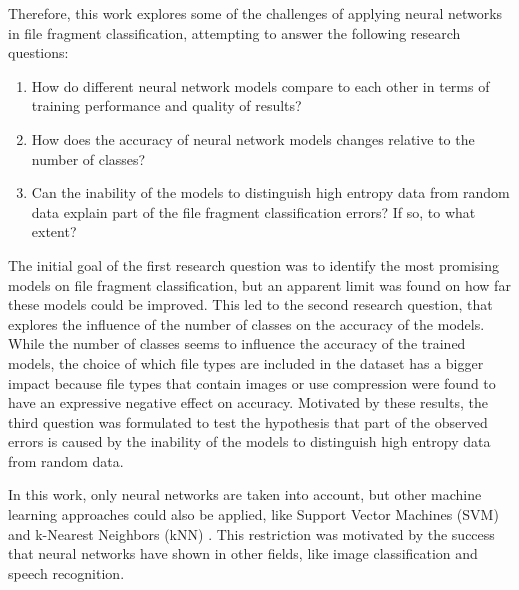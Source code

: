 Therefore, this work explores some of the challenges of applying neural networks in file fragment classification, attempting to answer the following research questions:

\begin{enumerate}[itemindent=\parindent,label=\textbf{Q\arabic*.}]

    \item How do different neural network models compare to each other in terms of training performance and quality of results?
    
    \item How does the accuracy of neural network models changes relative to the number of classes?

    \item Can the inability of the models to distinguish high entropy data from random data explain part of the file fragment classification errors? If so, to what extent?
\end{enumerate}

The initial goal of the first research question was to identify the most promising models on file fragment classification, but an apparent limit was found on how far these models could be improved.
This led to the second research question, that explores the influence of the number of classes on the accuracy of the models. While the number of classes seems to influence the accuracy of the trained models, the choice of which file types are included in the dataset has a bigger impact because file types that contain images or use compression were found to have an expressive negative effect on accuracy.
Motivated by these results, the third question was formulated to test the hypothesis that part of the observed errors is caused by the inability of the models to distinguish high entropy data from random data.


In this work, only neural networks are taken into account, but other machine learning approaches could also be applied, like Support Vector Machines (SVM) \cite{fitzgerald_using_2012} and k-Nearest Neighbors (kNN) \cite{axelsson_normalised_2010}. This restriction was motivated by the success that neural networks have shown in other fields, like image classification\cite{matan_reading_1992} and speech recognition\cite{graves_speech_2013}.
